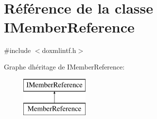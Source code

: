 \hypertarget{class_i_member_reference}{}\section{Référence de la classe I\+Member\+Reference}
\label{class_i_member_reference}


{\ttfamily \#include $<$doxmlintf.\+h$>$}

Graphe d\textquotesingle{}héritage de I\+Member\+Reference\+:\begin{figure}[H]
\begin{center}
\leavevmode
\includegraphics[height=2.000000cm]{class_i_member_reference}
\end{center}
\end{figure}
